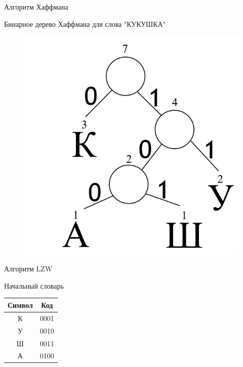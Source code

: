 \documentclass[11pt]{beamer}
\begin{document}
\begin{frame}{Алгоритм Хаффмана}
\begin{block}{Бинарное дерево Хаффмана для слова "КУКУШКА"}
\begin{figure}[H]
	\begin{center}
		\includegraphics[scale=0.42]{../pics/Huffman/huffman.png}
	\end{center}
\end{figure}	
\end{block}				
\end{frame}



\begin{frame}{Алгоритм LZW}
\begin{block}{Начальный словарь}
\renewcommand{\arraystretch}{1.5}
\begin{table}[H]
\begin{center}
	\begin{tabular}{|c|c|}
		\hline	
		Символ & Код \\
		\hline
		  К    & 0001 \\
		\hline
		  У	   & 0010 \\
		\hline  
	  	  Ш	   & 0011 \\
		\hline  	
		  А    & 0100 \\
		\hline
	\end{tabular}
\end{center}
\end{table}
\end{block}				
\end{frame}
\end{document}
